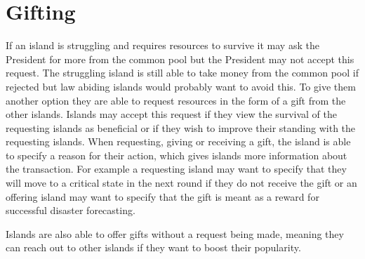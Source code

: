 \section{Gifting}  
\label{sec:IITO:gifting}  


If an island is struggling and requires resources to survive it may ask the President for more from the common pool but the President may not accept this request. The struggling island is still able to take money from the common pool if rejected but law abiding islands would probably want to avoid this. To give them another option they are able to request resources in the form of a gift from the other islands. Islands may accept this request if they view the survival of the requesting islands as beneficial or if they wish to improve their standing with the requesting islands. When requesting, giving or receiving a gift, the island is able to specify a reason for their action, which gives islands more information about the transaction. For example a requesting island may want to specify that they will move to a critical state in the next round if they do not receive the gift or an offering island may want to specify that the gift is meant as a reward for successful disaster forecasting.

Islands are also able to offer gifts without a request being made, meaning they can reach out to other islands if they want to boost their popularity.